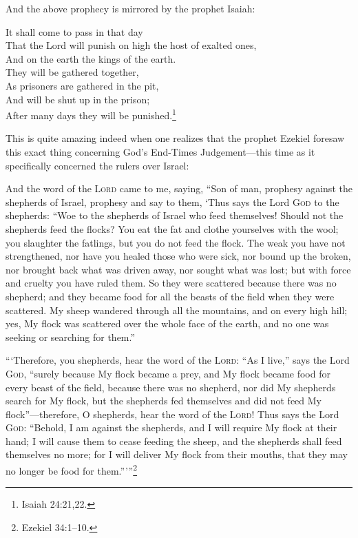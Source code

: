 \documentclass[letterpaper,12pt]{article}
\newenvironment{squotation}
  {\small\quotation}
  {\endquotation\normalsize}
\newenvironment{sverse}
  {\small\verse}
  {\endverse\normalsize}
\begin{document}
And the above prophecy is mirrored by the prophet Isaiah:

\begin{sverse}
It shall come to pass in that day\\
That the Lord will punish on high the host of exalted ones,\\
And on the earth the kings of the earth.\\
They will be gathered together,\\
As prisoners are gathered in the pit,\\
And will be shut up in the prison;\\
After many days they will be punished.\footnote{Isaiah 24:21,22.}
\end{sverse}

This is quite amazing indeed when one realizes that the prophet Ezekiel foresaw this exact thing concerning God's End-Times Judgement---this time as it specifically concerned the rulers over Israel:

\begin{squotation}
And the word of the \textsc{Lord} came to me, saying, ``Son of man, prophesy against the shepherds of Israel, prophesy and say to them, `Thus says the Lord \textsc{God} to the shepherds: ``Woe to the shepherds of Israel who feed themselves! Should not the shepherds feed the flocks? You eat the fat and clothe yourselves with the wool; you slaughter the fatlings, but you do not feed the flock. The weak you have not strengthened, nor have you healed those who were sick, nor bound up the broken, nor brought back what was driven away, nor sought what was lost; but with force and cruelty you have ruled them. So they were scattered because there was no shepherd; and they became food for all the beasts of the field when they were scattered. My sheep wandered through all the mountains, and on every high hill; yes, My flock was scattered over the whole face of the earth, and no one was seeking or searching for them.''

``\thinspace`Therefore, you shepherds, hear the word of the \textsc{Lord}: ``As I live,'' says the Lord \textsc{God}, ``surely because My flock became a prey, and My flock became food for every beast of the field, because there was no shepherd, nor did My shepherds search for My flock, but the shepherds fed themselves and did not feed My flock''---therefore, O shepherds, hear the word of the \textsc{Lord}! Thus says the Lord \textsc{God}: ``Behold, I am against the shepherds, and I will require My flock at their hand; I will cause them to cease feeding the sheep, and the shepherds shall feed themselves no more; for I will deliver My flock from their mouths, that they may no longer be food for them.''\thinspace'\thinspace''\footnote{Ezekiel 34:1--10.}
\end{squotation}
\end{document}
